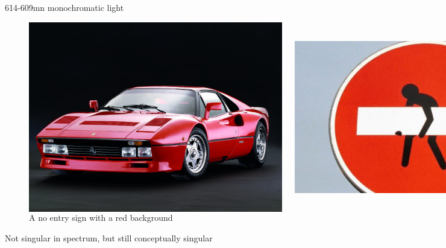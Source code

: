 \documentclass[xcolor=dvipsnames]{beamer}
\begin{document}
\begin{frame}{614-609mn monochromatic light}
\begin{figure}
  \centering
  \begin{columns}
    \centering
    \caption {A red thing}
    \includegraphics[width=0.99\textwidth]{ferrari}
    \centering
    \caption {A no entry sign with a red background}
    \includegraphics[width=0.99\textwidth]{red_sign}
  \end{columns}
\end{figure}
Not singular in spectrum, but still conceptually singular
\end{frame}
\end{document}
